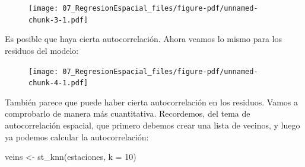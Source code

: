 \documentclass[
  letterpaper,
  DIV=11,
  numbers=noendperiod]{scrreprt}
\newenvironment{Shaded}{\begin{snugshade}}{\end{snugshade}}
\newcommand{\AttributeTok}[1]{\textcolor[rgb]{0.40,0.45,0.13}{#1}}
\newcommand{\CommentTok}[1]{\textcolor[rgb]{0.37,0.37,0.37}{#1}}
\newcommand{\ConstantTok}[1]{\textcolor[rgb]{0.56,0.35,0.01}{#1}}
\newcommand{\DecValTok}[1]{\textcolor[rgb]{0.68,0.00,0.00}{#1}}
\newcommand{\FunctionTok}[1]{\textcolor[rgb]{0.28,0.35,0.67}{#1}}
\newcommand{\NormalTok}[1]{\textcolor[rgb]{0.00,0.23,0.31}{#1}}
\newcommand{\OtherTok}[1]{\textcolor[rgb]{0.00,0.23,0.31}{#1}}
\newcommand{\SpecialCharTok}[1]{\textcolor[rgb]{0.37,0.37,0.37}{#1}}
\newcommand{\StringTok}[1]{\textcolor[rgb]{0.13,0.47,0.30}{#1}}
\begin{document}
\begin{figure}[H]

{\centering \texttt{[image: 07\_RegresionEspacial\_files/figure-pdf/unnamed-chunk-3-1.pdf]}

}

\end{figure}

Es posible que haya cierta autocorrelación. Ahora veamos lo mismo para
los residuos del modelo:

\begin{Shaded}
\end{Shaded}

\begin{figure}[H]

{\centering \texttt{[image: 07\_RegresionEspacial\_files/figure-pdf/unnamed-chunk-4-1.pdf]}

}

\end{figure}

También parece que puede haber cierta autocorrelación en los residuos.
Vamos a comprobarlo de manera más cuantitativa. Recordemos, del tema de
autocorrelación espacial, que primero debemos crear una lista de
vecinos, y luego ya podemos calcular la autocorrelación:

\begin{Shaded}
\begin{Highlighting}[]
\NormalTok{veins }\OtherTok{\textless{}{-}} \FunctionTok{st\_knn}\NormalTok{(estaciones, }\AttributeTok{k =} \DecValTok{10}\NormalTok{)}
\end{Highlighting}
\end{Shaded}
\end{document}
